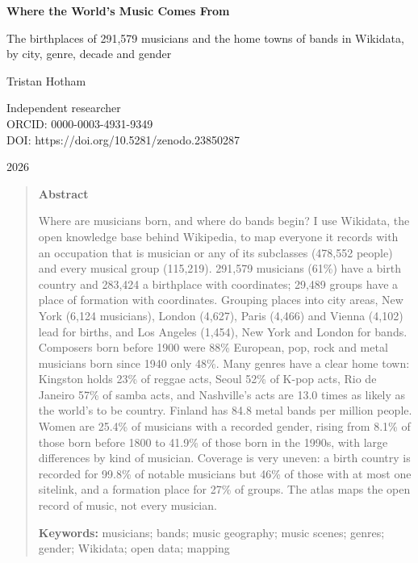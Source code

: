 \documentclass[11pt,a4paper]{article}
\begin{document}
\begin{center}
{\Large\bfseries Where the World's Music Comes From\par}
\vspace{0.4em}
{\large The birthplaces of 291,579 musicians and the home towns of bands in Wikidata,\\by city, genre, decade and gender\par}
\vspace{1.2em}
{\large Tristan Hotham\par}
\vspace{0.3em}
{\small Independent researcher\\
ORCID: 0000-0003-4931-9349\\
DOI: https://doi.org/10.5281/zenodo.23850287\par}
\vspace{0.8em}
2026
\end{center}

\begin{quote}
\small
\begin{center}\textbf{Abstract}\end{center}
Where are musicians born, and where do bands begin? I use Wikidata, the open knowledge base behind Wikipedia, to map everyone it records with an occupation that is musician or any of its subclasses (478,552 people) and every musical group (115,219). 291,579 musicians (61\%) have a birth country and 283,424 a birthplace with coordinates; 29,489 groups have a place of formation with coordinates. Grouping places into city areas, New York (6,124 musicians), London (4,627), Paris (4,466) and Vienna (4,102) lead for births, and Los Angeles (1,454), New York and London for bands. Composers born before 1900 were 88\% European, pop, rock and metal musicians born since 1940 only 48\%. Many genres have a clear home town: Kingston holds 23\% of reggae acts, Seoul 52\% of K-pop acts, Rio de Janeiro 57\% of samba acts, and Nashville's acts are 13.0 times as likely as the world's to be country. Finland has 84.8 metal bands per million people. Women are 25.4\% of musicians with a recorded gender, rising from 8.1\% of those born before 1800 to 41.9\% of those born in the 1990s, with large differences by kind of musician. Coverage is very uneven: a birth country is recorded for 99.8\% of notable musicians but 46\% of those with at most one sitelink, and a formation place for 27\% of groups. The atlas maps the open record of music, not every musician.

\textbf{Keywords:} musicians; bands; music geography; music scenes; genres; gender; Wikidata; open data; mapping
\end{quote}
\end{document}
